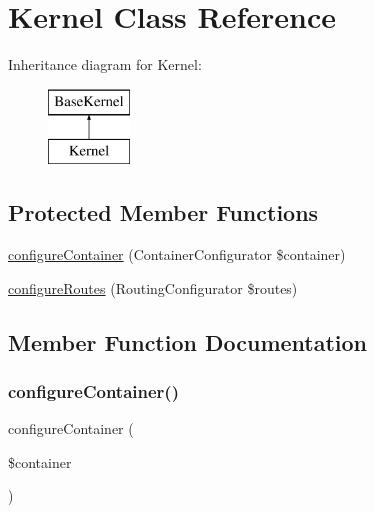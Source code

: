 \hypertarget{class_app_1_1_kernel}{}\section{Kernel Class Reference}
\label{class_app_1_1_kernel}
Inheritance diagram for Kernel\+:\begin{figure}[H]
\begin{center}
\leavevmode
\includegraphics[height=2.000000cm]{class_app_1_1_kernel}
\end{center}
\end{figure}
\subsection*{Protected Member Functions}
\begin{DoxyCompactItemize}
\item 
\mbox{\hyperlink{class_app_1_1_kernel_a1776c0577417142eedd4b5693ad65546}{configure\+Container}} (Container\+Configurator \$container)
\item 
\mbox{\hyperlink{class_app_1_1_kernel_a8208f0c7a8a63568f8bae24547f3a666}{configure\+Routes}} (Routing\+Configurator \$routes)
\end{DoxyCompactItemize}


\subsection{Member Function Documentation}
\mbox{\label{class_app_1_1_kernel_a1776c0577417142eedd4b5693ad65546}} 
\subsubsection{\texorpdfstring{configure\+Container()}{configureContainer()}}
{\footnotesize\ttfamily configure\+Container (\begin{DoxyParamCaption}\item[{Container\+Configurator}]{\$container }\end{DoxyParamCaption})\hspace{0.3cm}{\ttfamily [protected]}}

